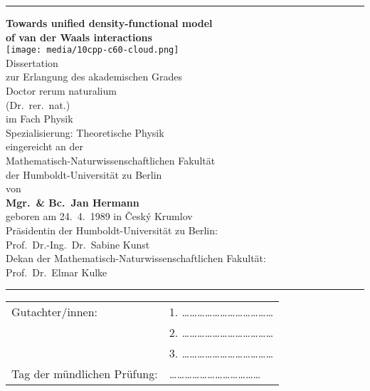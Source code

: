 







\begin{titlepage}
\sffamily
\hrule
\begin{center}
\vfill{\Large\bfseries Towards unified density-functional model\\of van der Waals interactions}\\
\vfill\texttt{[image: media/10cpp-c60-cloud.png]}\\
\vfill{\large Dissertation}\\[1em]
zur Erlangung des akademischen Grades \\[0.5em]
Doctor rerum naturalium \\
(Dr.\ rer.\ nat.) \\[0.5em]
im Fach Physik \\
{\small Spezialisierung: Theoretische Physik} \\[1em]
eingereicht an der \\
Mathematisch-Naturwissenschaftlichen Fakultät \\
der Humboldt-Universität zu Berlin \\[1em]
von \\[0.5em]
{\bfseries Mgr.\ \& Bc.\ Jan Hermann} \\[0.5em]
geboren am 24.\ 4.\ 1989 in Český Krumlov \\[2em]
{\small Präsidentin der Humboldt-Universität zu Berlin: \\
Prof.\ Dr.-Ing.\ Dr.\ Sabine Kunst \\[0.5em]
Dekan der Mathematisch-Naturwissenschaftlichen Fakultät: \\
Prof.\ Dr.\ Elmar Kulke}
\end{center}
\vfill
\hrule
\vspace{1cm}
\begin{tabular}{p{6cm}l}
Gutachter/innen: & 1. \ldots\ldots\ldots\ldots\ldots\ldots\ldots\ldots\ldots\ldots\ldots\ldots \\
& 2. \ldots\ldots\ldots\ldots\ldots\ldots\ldots\ldots\ldots\ldots\ldots\ldots \\
& 3. \ldots\ldots\ldots\ldots\ldots\ldots\ldots\ldots\ldots\ldots\ldots\ldots \\[1em]
Tag der mündlichen Prüfung: & \ldots\ldots\ldots\ldots\ldots\ldots\ldots\ldots\ldots\ldots\ldots\ldots
\end{tabular}
\end{titlepage}
\thispagestyle{empty}

